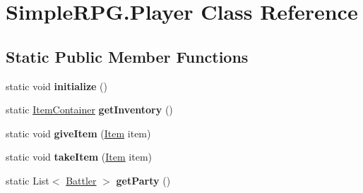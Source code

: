 \hypertarget{class_simple_r_p_g_1_1_player}{\section{Simple\+R\+P\+G.\+Player Class Reference}
\label{class_simple_r_p_g_1_1_player}
}
\subsection*{Static Public Member Functions}
\begin{DoxyCompactItemize}
\item 
\hypertarget{class_simple_r_p_g_1_1_player_a848b6a19ab65bf51097e7e4cb47ad021}{static void {\bfseries initialize} ()}\label{class_simple_r_p_g_1_1_player_a848b6a19ab65bf51097e7e4cb47ad021}

\item 
\hypertarget{class_simple_r_p_g_1_1_player_a7b7f4514e3020e56a948316ef1fb5cc9}{static \hyperlink{class_simple_r_p_g_1_1_item_container}{Item\+Container} {\bfseries get\+Inventory} ()}\label{class_simple_r_p_g_1_1_player_a7b7f4514e3020e56a948316ef1fb5cc9}

\item 
\hypertarget{class_simple_r_p_g_1_1_player_ab5267292b513dc9b853f607dd34b1c38}{static void {\bfseries give\+Item} (\hyperlink{class_simple_r_p_g_1_1_item}{Item} item)}\label{class_simple_r_p_g_1_1_player_ab5267292b513dc9b853f607dd34b1c38}

\item 
\hypertarget{class_simple_r_p_g_1_1_player_a50294b9cd7ca33f530dce63e83b0acfe}{static void {\bfseries take\+Item} (\hyperlink{class_simple_r_p_g_1_1_item}{Item} item)}\label{class_simple_r_p_g_1_1_player_a50294b9cd7ca33f530dce63e83b0acfe}

\item 
\hypertarget{class_simple_r_p_g_1_1_player_a94a62653441c455e38a9572ccc6b8936}{static List$<$ \hyperlink{class_simple_r_p_g_1_1_battler}{Battler} $>$ {\bfseries get\+Party} ()}\label{class_simple_r_p_g_1_1_player_a94a62653441c455e38a9572ccc6b8936}

\end{DoxyCompactItemize}
